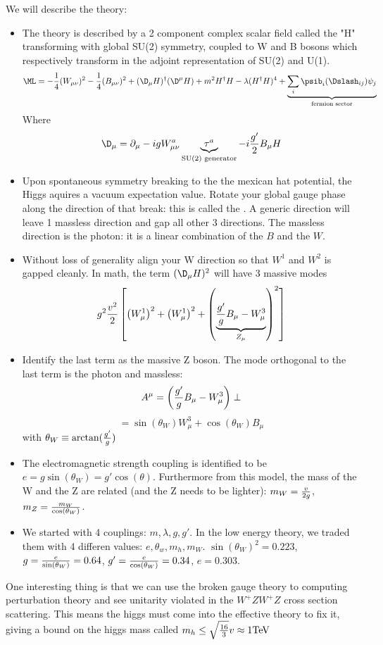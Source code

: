 \documentclass[11pt]{scrartcl}
\begin{document}
We will describe the theory:
\begin{itemize}
	\item  The theory is described by a 2 component complex scalar field called the  "H" transforming with global SU(2) symmetry, coupled to W and B bosons which respectively transform in the adjoint representation of SU(2) and U(1).
	\[ \ML = - \frac14 (W_{\mu \nu})^2 - \frac14 (B_{\mu \nu})^2 + (\D_\mu H)^\dagger (\D^\mu H)  + m^2 H^\dagger H - \lambda (H^\dagger H)^4  + \underbrace{\sum_{i} \psib_i (\Dslash_{ij}) \psi_j}_{\text{fermion sector}}\]
	Where \[ \D_\mu = \partial_\mu - i g W_{\mu \nu}^a \underbrace{\tau^a}_{\text{SU(2) generator}} - i {g' \over 2} B_\mu H \]
	\item Upon spontaneous symmetry breaking to the the mexican hat potential, the Higgs aquires a vacuum expectation value.  Rotate your global gauge phase along the direction of that break: this is called the .  A generic direction will leave 1 massless direction and gap all other 3 directions.  The massless direction is the photon: it is a linear combination of the $B$ and the $W$.
	\item Without loss of generality align your W direction so that $W^1$ and $W^2$ is gapped cleanly. In math, the term $(\D_\mu H)^2$ will have 3 massive modes
	\[g^2 {v^2 \over 2} \left[ \left(W_\mu^{1} \right)^2 + \left(W_\mu^{1} \right)^2+ \left(\underbrace{{g' \over g} B_\mu - W_\mu^3}_{Z_\mu } \right)^2 \right] \]
	\item Identify the last term as the massive Z boson.
	The mode orthogonal to the last term is the photon and massless:
	\[A^\mu = \left({g' \over g} B_\mu - W_\mu^3 \right)\perp \]
	 \[ = \sin (\theta_W) W_\mu^3 + \cos(\theta_W) B_\mu \]
	 with $\theta_W \equiv \arctan({g' \over g})$
	 \item The electromagnetic strength coupling is identified to be $e = g \sin(\theta_W) = g' \cos(\theta)$.
	 Furthermore from this model, the mass of the W and the Z are related (and the Z needs to be lighter):
	 $m_W = {v \over 2 g}$, $ m_Z = {m_W \over \cos(\theta_W)}$.
	 \item We started with 4 couplings: $m, \lambda, g, g'$.  In the low energy theory, we traded them with 4 differen values:
	 $e, \theta_w, m_h, m_W$.  $\sin(\theta_W)^2 = 0.223$, $g = {e \over \sin(\theta_W)} = 0.64$, $g' = {e \over \cos(\theta_W)} = 0.34$, $e = 0.303$.
	\end{itemize}

One interesting thing is that we can use the broken gauge theory to  computing perturbation theory and see unitarity violated in the $W^+ Z W^+ Z$ cross section scattering. This means the higgs must come into the effective theory to fix it, giving a bound on the higgs mass called  $m_h \leq \sqrt{16 \over 3} v \approx \mathrm{1 TeV}$
\end{document}
